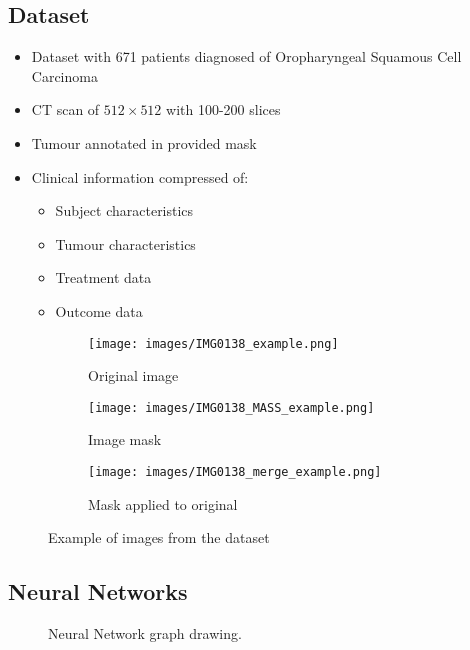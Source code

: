 \subsection{Dataset}
\begin{frame}{\insertsubsec}
  \begin{itemize}
    \item Dataset with 671 patients diagnosed of Oropharyngeal Squamous Cell Carcinoma
    \item CT scan of \( 512 \times 512 \) with 100-200 slices
    \item Tumour annotated in provided mask
    \item Clinical information compressed of:
    \begin{itemize}
      \item Subject characteristics
      \item Tumour characteristics
      \item Treatment data
      \item Outcome data
    \end{itemize}
  \end{itemize}
\end{frame}

\begin{frame}
  \begin{figure}
    \centering
    \begin{subfigure}[t]{.32\textwidth}
      \centering
      \texttt{[image: images/IMG0138\_example.png]}
      \caption{Original image}
    \end{subfigure}
    \hfill
    \begin{subfigure}[t]{.32\textwidth}
      \centering
      \texttt{[image: images/IMG0138\_MASS\_example.png]}
      \caption{Image mask}
    \end{subfigure}
    \hfill
    \begin{subfigure}[t]{.32\textwidth}
      \centering
      \texttt{[image: images/IMG0138\_merge\_example.png]}
      \caption{Mask applied to original}
    \end{subfigure}
  
    \caption[Images from the dataset]{
      Example of images from the dataset
    }
  \end{figure}
\end{frame}

\subsection{Neural Networks}
\begin{frame}{\insertsubsec}
  \begin{figure}
    \centering
    
    \caption[Neural network graph]{
      Neural Network graph drawing. 
    }
  \end{figure}
\end{frame}

